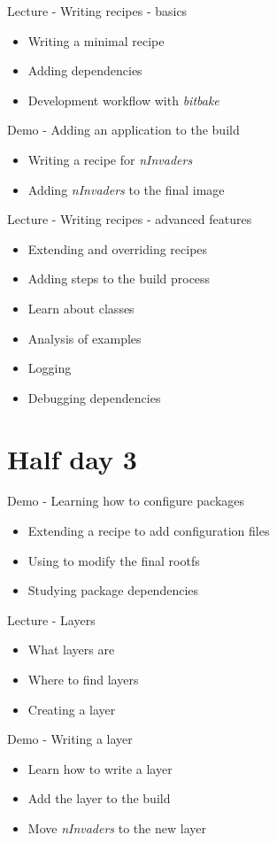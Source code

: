 \documentclass[a4paper,12pt,obeyspaces,spaces,hyphens]{article}
\begin{document}
\feagendatwocolumn
{Lecture - Writing recipes - basics}
{
  \begin{itemize}
  \item Writing a minimal recipe
  \item Adding dependencies
  \item Development workflow with {\em bitbake}
  \end{itemize}
}
{Demo - Adding an application to the build}
{
  \begin{itemize}
  \item Writing a recipe for {\em nInvaders}
  \item Adding {\em nInvaders} to the final image
  \end{itemize}
}

\feagendaonecolumn
{Lecture - Writing recipes - advanced features}
{
  \begin{itemize}
  \item Extending and overriding recipes
  \item Adding steps to the build process
  \item Learn about classes
  \item Analysis of examples
  \item Logging
  \item Debugging dependencies
  \end{itemize}
}

\section{Half day 3}

\feagendaonecolumn
{Demo - Learning how to configure packages}
{
  \begin{itemize}
  \item Extending a recipe to add configuration files
  \item Using  to modify the final rootfs
  \item Studying package dependencies
  \end{itemize}
}

\feagendatwocolumn
{Lecture - Layers}
{
  \begin{itemize}
  \item What layers are
  \item Where to find layers
  \item Creating a layer
  \end{itemize}
}
{Demo - Writing a layer}
{
  \begin{itemize}
  \item Learn how to write a layer
  \item Add the layer to the build
  \item Move {\em nInvaders} to the new layer
  \end{itemize}
}
\end{document}
